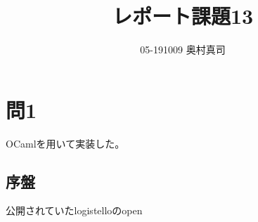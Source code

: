 \documentclass[11pt,a4paper]{jsarticle}
\title{レポート課題13}
\author{05-191009 奥村真司}
\date{}
\begin{document}
\maketitle
%
%
\section*{問1}
OCamlを用いて実装した。
\subsection{序盤}
公開されていたlogistelloのopen
\begin{lstlisting}[basicstyle=\ttfamily\footnotesize, frame=single]

\end{lstlisting}
\end{document}
